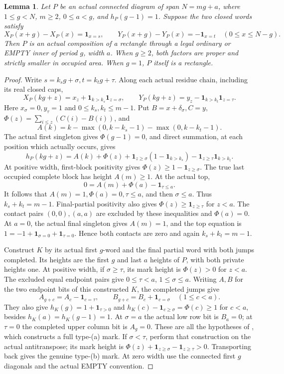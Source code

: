 \documentclass[11pt,a4paper]{amsart}
\numberwithin{equation}{section}
\theoremstyle{plain}
\newtheorem{lemma}[theorem]{Lemma}
\theoremstyle{definition}
\newcommand{\one}{\mathbf1}
\begin{document}
\begin{lemma}\label{ge:rectangle}
Let \(P\) be an actual connected diagram of span \(N=mg+a\),
where \(1\le g<N\), \(m\ge2\), \(0\le a<g\), and
\(h_P(g-1)=1\).  Suppose the two closed words satisfy
\[
 X_P(x+g)-X_P(x)=\one_{x=s},\qquad
 Y_P(x+g)-Y_P(x)=-\one_{x=t}\quad(0\le x\le N-g).
\]
Then \(P\) is an actual composition of a rectangle through a legal
ordinary or EMPTY inner of period \(g\), width \(a\).  When
\(g\ge2\), both factors are proper and strictly smaller in occupied
area.  When \(g=1\), \(P\) itself is a rectangle.
\end{lemma}
\begin{proof}
Write \(s=k_sg+\sigma,t=k_tg+\tau\).  Along each actual residue chain,
including its real closed caps,
\[
 X_P(kg+z)=x_z+\one_{k>k_s}\one_{z=\sigma},\qquad
 Y_P(kg+z)=y_z-\one_{k>k_t}\one_{z=\tau}.
\]
Here \(x_\sigma=0,y_\tau=1\) and \(0\le k_s,k_t\le m-1\).
Put \(B=x+\delta_\sigma,C=y\),
\(\Phi(z)=\sum_{i\le z}(C(i)-B(i))\), and
\[
 A(k)=k-\max(0,k-k_s-1)-\max(0,k-k_t-1).
\]
The actual first singleton gives \(\Phi(g-1)=0\), and direct
summation, at each position which actually occurs, gives
\[
 h_P(kg+z)=A(k)+\Phi(z)
       +\one_{z\ge\sigma}(1-\one_{k>k_s})
       -\one_{z\ge\tau}\one_{k>k_t}.
\]
At positive width, first-block positivity gives
\(\Phi(z)\ge1-\one_{z\ge\sigma}\).  The true last occupied
complete block has height \(A(m)\ge1\).  At the actual top,
\[
 0=A(m)+\Phi(a)-\one_{\tau\le a}.
\]
It follows that \(A(m)=1,\Phi(a)=0,\tau\le a\), and then
\(\sigma\le a\).  Thus \(k_s+k_t=m-1\).  Final-partial positivity
also gives \(\Phi(z)\ge\one_{z\ge\tau}\) for \(z<a\).
The contact pairs \((0,0),(a,a)\) are excluded by these inequalities
and \(\Phi(a)=0\).  At \(a=0\), the actual final singleton gives
\(A(m)=1\), and the top equation is
\(1=-1+\one_{\sigma=0}+\one_{\tau=0}\).  Hence both contacts
are zero and again \(k_s+k_t=m-1\).

Construct \(K\) by its actual first \(g\)-word and the final
partial word with both jumps completed.  Its heights are the first
\(g\) and last \(a\) heights of \(P\), with both private heights
one.  At positive width, if \(\sigma\ge\tau\), its mark height
is \(\Phi(z)>0\) for \(z<a\).  The excluded equal endpoint
pairs give \(0\le\tau<a\), \(1\le\sigma\le a\).
Writing \(A,B\) for the two endpoint bits of this constructed \(K\),
the completed jumps give
\[
 A_{g+c}=A_c-\one_{c=\tau},\qquad
 B_{g+c}=B_c+\one_{c=\sigma}\quad(1\le c<a).
\]
They also give \(h_K(g)=1+\one_{\tau>0}\) and
\(h_K(c)-\one_{c\ge\sigma}=\Phi(c)\ge1\) for \(c<a\),
besides \(h_K(a)=h_K(g-1)=1\).
At \(\sigma=a\) the actual low row bit is \(B_a=0\);
at \(\tau=0\) the completed upper column bit is \(A_g=0\).
These are all the hypotheses of
\cite[Ordinary cell criterion]{Shields2026Gluing}, which constructs
a full type-(a) mark.  If
\(\sigma<\tau\), perform that construction on the actual
antitranspose; its mark height is
\(\Phi(z)+\one_{z\ge\sigma}-\one_{z\ge\tau}>0\).
Transporting back gives the genuine type-(b) mark.  At zero width use
the connected first \(g\) diagonals and the actual EMPTY convention.


\end{proof}
\end{document}
